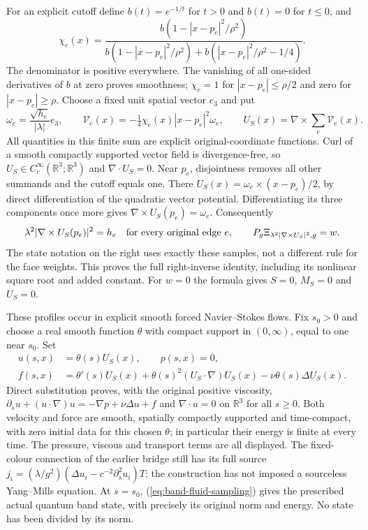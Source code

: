 For an explicit cutoff define $b(t)=e^{-1/t}$ for $t>0$ and
$b(t)=0$ for $t\le0$, and
\[
 \chi_e(x)=\frac{b(1-|x-p_e|^2/\rho^2)}
 {b(1-|x-p_e|^2/\rho^2)+b(|x-p_e|^2/\rho^2-1/4)}.
\]
The denominator is positive everywhere. The vanishing of all
one-sided derivatives of $b$ at zero proves smoothness;
$\chi_e=1$ for $|x-p_e|\le\rho/2$ and zero for
$|x-p_e|\ge\rho$. Choose a fixed unit spatial vector $e_3$ and put
\begin{equation}\label{eq:band-fluid-right-inverse}
 \omega_e=\frac{\sqrt{h_e}}{|\lambda|}e_3,\qquad
 \mathcal V_e(x)=-\tfrac14\chi_e(x)|x-p_e|^2\omega_e,
 \qquad U_S(x)=\nabla\times\sum_e\mathcal V_e(x).
\end{equation}
All quantities in this finite sum are explicit original-coordinate
functions. Curl of a smooth compactly supported vector field is
divergence-free, so $U_S\in C_c^\infty(\mathbb R^3;\mathbb R^3)$
and $\nabla\cdot U_S=0$. Near $p_e$, disjointness removes all other
summands and the cutoff equals one. There
$U_S(x)=\omega_e\times(x-p_e)/2$, by direct differentiation of
the quadratic vector potential. Differentiating its three components
once more gives $\nabla\times U_S(p_e)=\omega_e$. Consequently
\begin{equation}\label{eq:band-fluid-sampling}
 \lambda^2|\nabla\times U_S(p_e)|^2=h_e\quad\hbox{for every original edge }e,
 \qquad P_g\Xi_{\lambda^2|\nabla\times U_S|^2,g}=w.
\end{equation}
The state notation on the right uses exactly these samples, not a
different rule for the face weights. This proves the full right-inverse
identity, including its nonlinear square root and added constant.
For $w=0$ the formula gives $S=0$, $M_S=0$ and $U_S=0$.

These profiles occur in explicit smooth forced Navier--Stokes flows.
Fix $s_0>0$ and choose a real smooth function $\theta$ with compact
support in $(0,\infty)$, equal to one near $s_0$. Set
\begin{align}
 u(s,x)&=\theta(s)U_S(x),\qquad p(s,x)=0,\nonumber\\
 f(s,x)&=\theta'(s)U_S(x)
    +\theta(s)^2(U_S\cdot\nabla)U_S(x)-\nu\theta(s)\Delta U_S(x).
 \label{eq:band-forced-fluid}
\end{align}
Direct substitution proves, with the original positive viscosity,
$\partial_su+(u\cdot\nabla)u=-\nabla p+\nu\Delta u+f$ and
$\nabla\cdot u=0$ on $\mathbb R^3$ for all $s\ge0$.
Both velocity and force are smooth, spatially compactly supported
and time-compact, with zero initial data for this chosen $\theta$;
in particular their energy is finite at every time. The pressure,
viscous and transport terms are all displayed. The fixed-colour
connection of the earlier bridge still has its full source
$j_i=(\lambda/g^2)(\Delta u_i-c^{-2}\partial_s^2u_i)T$;
the construction has not imposed a sourceless Yang--Mills equation.
At $s=s_0$, (\ref{eq:band-fluid-sampling}) gives the prescribed
actual quantum band state, with precisely its original norm and
energy. No state has been divided by its norm.

